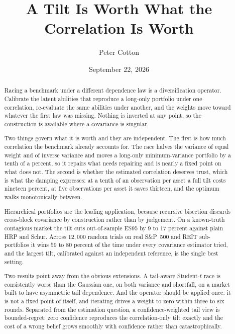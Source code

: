 \documentclass[11pt]{article}
\title{A Tilt Is Worth What the Correlation Is Worth}
\author{Peter Cotton}
\date{September 22, 2026}
\begin{document}
\maketitle

\begin{abstract}
Racing a benchmark under a different dependence law is a diversification
operator. Calibrate the latent abilities that reproduce a long-only portfolio
under one correlation, re-evaluate the same abilities under another, and the
weights move toward whatever the first law was missing. Nothing is inverted at
any point, so the construction is available where a covariance is singular.

Two things govern what it is worth and they are independent. The first is how
much correlation the benchmark already accounts for. The race halves the
variance of equal weight and of inverse variance and moves a long-only
minimum-variance portfolio by a tenth of a percent, so it repairs what needs
repairing and is nearly a fixed point on what does not. The second is whether
the estimated correlation deserves trust, which is what the damping expresses:
at a tenth of an observation per asset a full tilt costs nineteen percent, at
five observations per asset it saves thirteen, and the optimum walks
monotonically between.

Hierarchical portfolios are the leading application, because recursive
bisection discards cross-block covariance by construction rather than by
judgement. On a known-truth contagious market the tilt cuts out-of-sample
ES95 by $9$ to $17$ percent against plain HRP and Schur. Across $12{,}000$
random trials on real S\&P~500 and REIT sub-portfolios it wins $59$ to $80$
percent of the time under every covariance estimator tried, and the largest
tilt, calibrated against an independent reference, is the single best setting.

Two results point away from the obvious extensions. A tail-aware Student-$t$
race is consistently worse than the Gaussian one, on both variance and
shortfall, on a market built to have asymmetric tail dependence. And the
operator should be applied once: it is not a fixed point of itself, and
iterating drives a weight to zero within three to six rounds. Separated from
the estimation question, a confidence-weighted tail view is bounded-regret:
zero confidence reproduces the correlation-only tilt exactly and the cost of a
wrong belief grows smoothly with confidence rather than catastrophically.
\end{abstract}
\end{document}
